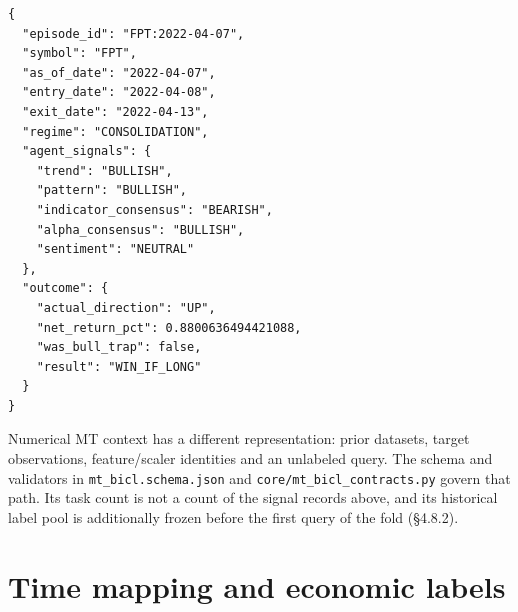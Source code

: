 \begin{Verbatim}[fontsize=\small,breaklines=true,breakanywhere=true]
{
  "episode_id": "FPT:2022-04-07",
  "symbol": "FPT",
  "as_of_date": "2022-04-07",
  "entry_date": "2022-04-08",
  "exit_date": "2022-04-13",
  "regime": "CONSOLIDATION",
  "agent_signals": {
    "trend": "BULLISH",
    "pattern": "BULLISH",
    "indicator_consensus": "BEARISH",
    "alpha_consensus": "BULLISH",
    "sentiment": "NEUTRAL"
  },
  "outcome": {
    "actual_direction": "UP",
    "net_return_pct": 0.8800636494421088,
    "was_bull_trap": false,
    "result": "WIN_IF_LONG"
  }
}
\end{Verbatim}

Numerical MT context has a different representation: prior datasets,
target observations, feature/scaler identities and an unlabeled query.
The schema and validators in \texttt{mt\_\allowbreak{}bicl.\allowbreak{}schema.\allowbreak{}json} and
\texttt{core/\allowbreak{}mt\_\allowbreak{}bicl\_\allowbreak{}contracts.\allowbreak{}py} govern that path. Its task count is not a
count of the signal records above, and its historical label pool is
additionally frozen before the first query of the fold (§4.8.2).

\section{Time mapping and economic labels}\label{s:1b09358c673b31ee}

\begingroup
\small
{}
\setlength{\tabcolsep}{3pt}

